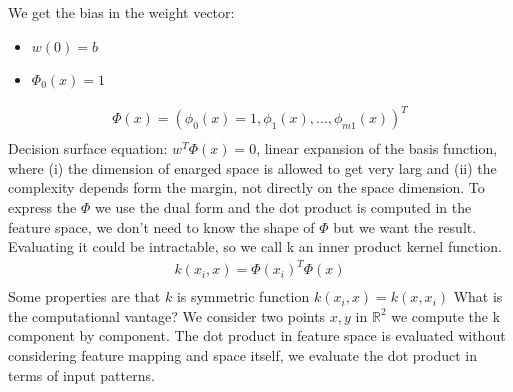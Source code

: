 \documentclass[12pt]{book}
\begin{document}
We get the bias in the weight vector:
\begin{itemize}
	\item $w(0) = b$
	\item $\Phi_0(x) = 1$
\end{itemize}

\begin{equation}
	\begin{aligned}
	\Phi(x) = (\phi_0(x) = 1, \phi_1(x), ..., \phi_{m1}(x))^T\\
	\end{aligned}
\end{equation}
Decision surface equation: $w^T\Phi(x) = 0$, linear expansion of the basis function, where (i) the dimension of enarged space is allowed to get very larg and (ii) the complexity depends form the margin, not directly on the space dimension.
\newline To express the $\Phi$ we use the dual form and the dot product is computed in the feature space, we don't need to know the shape of $\Phi$ but we want the result. Evaluating it could be intractable, so we call k an inner product kernel function.
\begin{equation}
	\begin{aligned}
		k(x_i, x) = \Phi(x_i)^T\Phi(x)\\
	\end{aligned}
\end{equation}
Some properties are that $k$ is symmetric function $k(x_i, x) = k(x, x_i)$\newline
What is the computational vantage?\newline
We consider two points $x,y$ in $\mathbb{R}^2$ we compute the k component by component.\newline
The dot product in feature space is evaluated without considering feature mapping and space itself, we evaluate the dot product in terms of input patterns.
\end{document}
